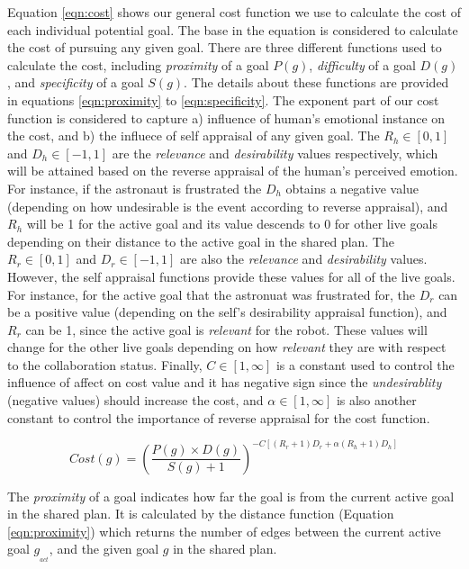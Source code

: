 \documentclass[conference]{IEEEtran}
\begin{document}
Equation \ref{eqn:cost} shows our general cost function we use to calculate the
cost of each individual potential goal. The base in the equation is considered
to calculate the cost of pursuing any given goal. There are three different
functions used to calculate the cost, including \textit{proximity} of a goal
$P(g)$, \textit{difficulty} of a goal $D(g)$, and \textit{specificity} of a
goal $S(g)$. The details about these functions are provided in equations
\ref{eqn:proximity} to \ref{eqn:specificity}. The exponent part of our cost
function is considered to capture a) influence of human's emotional instance on
the cost, and b) the influece of self appraisal of any given goal. The
$R_h\in[0,1]$ and $D_h\in[-1,1]$  are the \textit{relevance} and
\textit{desirability} values respectively, which will be attained based on the
reverse appraisal of the human's perceived emotion. For instance, if the
astronaut is frustrated the $D_h$ obtains a negative value (depending on how
undesirable is the event according to reverse appraisal), and $R_h$ will be 1
for the active goal and its value descends to 0 for other live goals depending
on their distance to the active goal in the shared plan. The $R_r\in[0,1]$ and
$D_r\in[-1,1]$ are also the \textit{relevance} and \textit{desirability} values.
However, the self appraisal functions provide these values for all of the live
goals. For instance, for the active goal that the astronuat was frustrated for,
the $D_r$ can be a positive value (depending on the self's desirability
appraisal function), and $R_r$ can be 1, since the active goal is
\textit{relevant} for the robot. These values will change for the other live
goals depending on how \textit{relevant} they are with respect to the
collaboration status. Finally, $C\in[1,\infty]$ is a constant used to control the
influence of affect on cost value and it has negative sign since the
\textit{undesirablity} (negative values) should increase the cost, and
$\alpha\in[1,\infty]$ is also another constant to control the importance of
reverse appraisal for the cost function.

\vspace*{-3mm}
\begin{equation}
Cost(g) = \left(\frac{P(g)\times D(g)}{S(g)+1}\right)^{-C[(R_r+1)D_r + \alpha
(R_h+1)D_h]}
\label{eqn:cost}
\end{equation}

The \textit{proximity} of a goal indicates how far the goal is from the current
active goal in the shared plan. It is calculated by the distance function
(Equation \ref{eqn:proximity}) which returns the number of edges between the
current active goal $g_{_{act}}$, and the given goal $g$ in the shared plan.
\end{document}
